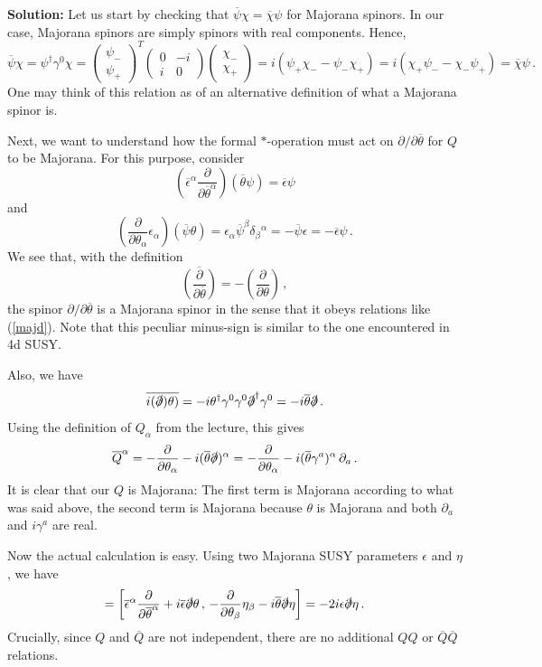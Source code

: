 \documentclass[12pt]{article}
\newcommand{\be}{\begin{equation}}
\newcommand{\ee}{\end{equation}}
\newcommand{\ol}{\overline}
\numberwithin{equation}{section}
\begin{document}
\noindent
{\bf Solution:} Let us start by checking that  $\ol{\psi}\chi=\ol{\chi}\psi$ for Majorana spinors. In our case, Majorana spinors are simply spinors with real components. Hence,
\be
\ol{\psi}\chi=\psi^\dagger\gamma^0\chi=
\left( \begin{array}{c} \psi_- \\ \psi_+ \end{array} \right)^T
\left( \begin{array}{rr} 0 & -i \\ i & 0 \end{array} \right)
\left( \begin{array}{c} \chi_- \\ \chi_+ \end{array} \right)
= i(\psi_+\chi_- - \psi_-\chi_+) = i (\chi_+\psi_- - \chi_-\psi_+)
= \ol{\chi}\psi\,.\label{majd}
\ee
One may think of this relation as of an alternative definition of what a Majorana spinor is.

Next, we want to understand how the formal $*$-operation must act on $\partial/\partial\ol{\theta}$ for $Q$ to be Majorana. For this purpose, consider
\be
\left(\ol{\epsilon}^\alpha\frac{\partial}{\partial\ol{\theta}^\alpha}\right)
(\ol{\theta}\psi) = \ol{\epsilon}\psi \label{maj1}
\ee
and
\be
\left(\frac{\partial}{\partial\theta_\alpha}\epsilon_\alpha\right)(\ol{\psi} \theta) = \epsilon_\alpha \ol{\psi}^\beta \delta_\beta{}^\alpha= - \ol{\psi}\epsilon = - \ol{\epsilon}\psi\,.\label{maj2}
\ee
We see that, with the definition 
\be
\ol{\left(\frac{\partial}{\partial\ol{\theta}}\right)}=-\left(
\frac{\partial}{\partial\theta} \right)\,,
\ee
the spinor $\partial/\partial\ol{\theta}$ is a Majorana spinor in the sense that it obeys relations like (\ref{majd}). Note that this peculiar minus-sign is similar to the one encountered in 4d SUSY.

Also, we have
\be
\ol{i(\slashed{\partial})\theta)}=-i\theta^\dagger\gamma^0\gamma^0 \slashed{\partial}^\dagger\gamma^0=-i\ol{\theta}\slashed{\partial}\,.
\ee
Using the definition of $Q_\alpha$ from the lecture, this gives
\be
\ol{Q}^\alpha=-\frac{\partial}{\partial\theta_\alpha}-i(\ol{\theta}
\slashed{\partial})^\alpha = -\frac{\partial}{\partial\theta_\alpha}-i(\ol{\theta}
\gamma^a)^\alpha\,\partial_a\,.
\ee
It is clear that our $Q$ is Majorana: The first term is Majorana according to what was said above, the second term is Majorana because $\theta$ is Majorana and both $\partial_a$ and $i\gamma^a$ are real.

Now the actual calculation is easy. Using two Majorana SUSY parameters $\epsilon$ and $\eta$, we have
\be
[\ol{\epsilon}Q,\ol{Q}\eta] = \left[ \ol{\epsilon}^\alpha
\frac{\partial}{\partial\ol{\theta}^\alpha}+i\ol{\epsilon}\slashed{\partial}\theta\,,\,
-\frac{\partial}{\partial\theta_\beta}\eta_\beta-i\ol{\theta}\slashed{\partial} \eta \right] = -2i\epsilon\slashed{\partial}\eta\,.
\ee
Crucially, since $Q$ and $\ol{Q}$ are not independent, there are no additional $QQ$ or $\ol{Q}\ol{Q}$ relations. 
\end{document}
